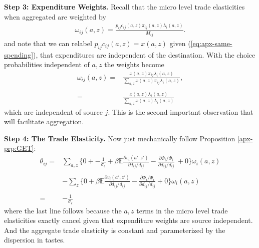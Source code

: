 \documentclass[12pt,pdftex]{article}
\begin{document}
\begin{onehalfspacing}
\textbf{Step 3: Expenditure Weights.} Recall that the micro level trade elasticities when aggregated are weighted by
\begin{align}
\omega_{ij}(a,z) = \frac{p_{ij}c_{ij}(a,z)\pi_{ij}(a,z) \lambda_{i}(a,z)}{M_{ij}}.
\end{align}
and note that we can relabel $p_{ij}c_{ij}(a,z) = x(a,z)$ given (\ref{eq:apx-same-spending}), that expenditures are independent of the destination. With the choice probabilities independent of $a,z$ the weights become
\begin{align}
\omega_{ij}(a,z) =& \frac{x(a,z)\pi_{ij} \lambda_{i}(a,z)}{\sum_{a,z}x(a,z)\pi_{ij} \lambda_{i}(a,z)}, \\
\nonumber \\
=& \frac{x(a,z) \lambda_{i}(a,z)}{\sum_{a,z} x(a,z) \lambda_{i}(a,z)}
\end{align}
which are independent of source $j$. This is the second important observation that will facilitate aggregation.

\textbf{Step 4: The Trade Elasticity.} Now just mechanically follow Proposition \ref{apx-prp:GET}:
\begin{align}
\nonumber
\theta_{ij} =& \sum_{a,z} \bigg \{ 0 + -\frac{1}{\sigma_{\epsilon}} + \beta \mathbb{E} \frac{\partial v_{i}(a',z')}{\partial d_{ij}/d_{ij}} -  \frac{\partial \Phi_{i} / \Phi_{i}}{\partial d_{ij}/d_{ij}} \ + 0 \bigg \}\omega_{i}(a,z) \\
\nonumber \\
& - \sum_{z} \bigg \{  0 + \beta \mathbb{E} \frac{\partial v_{i}(a',z')}{\partial d_{ij}/d_{ij}} -  \frac{\partial \Phi_{i} / \Phi_{i}}{\partial d_{ij}/d_{ij}} + 0 \bigg \}\omega_{i}(a,z) \\
\nonumber \\
= & -\frac{1}{\sigma_{\epsilon}} \nonumber
\end{align}
where the last line follows because the $a,z$ terms in the micro level trade elasticities exactly cancel given that expenditure weights are source independent. And the aggregate trade elasticity is constant and parameterized by the dispersion in tastes.


\end{onehalfspacing}
\end{document}
